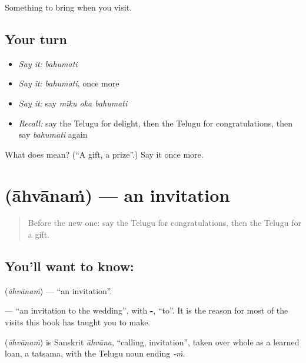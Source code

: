 \begin{grammarlens}[title={What you've built}]
Something to bring when you visit.
\end{grammarlens}

\subsection*{Your turn}
\begin{itemize}
\raggedright
  \item \emph{Say it:} \emph{bahumati}
  \item \emph{Say it:} \emph{bahumati}, once more
  \item \emph{Say it:} say \emph{mīku oka bahumati}
  \item \emph{Recall:} say the Telugu for delight, then the Telugu for congratulations, then say \emph{bahumati} again
\end{itemize}

\begin{tcolorbox}[breakable,colback=teal!4,colframe=teal!35!black,title={Before you move on}]
What does  mean? (\textquotedblleft{}A gift, a prize\textquotedblright{}.) Say it once more.
\end{tcolorbox}
\section[\texorpdfstring{\te{ఆహ్వానం} (āhvānaṁ)}{ఆహ్వానం (āhvānaṁ)}]{ (āhvānaṁ) — an invitation}

\label{lesson:TE-C99-invitation}



\begin{quote}
Before the new one: say the Telugu for congratulations, then the Telugu for a gift.
\end{quote}

\subsection*{You'll want to know: }
\textbf{} (\emph{āhvānaṁ}) — \textquotedblleft{}an invitation\textquotedblright{}.

\textbf{ } — \textquotedblleft{}an invitation to the wedding\textquotedblright{}, with \textbf{-}, \textquotedblleft{}to\textquotedblright{}. It is the reason for most of the visits this book has taught you to make.

\begin{cousinweb}
\textbf{} (\emph{āhvānaṁ}) is Sanskrit \emph{āhvāna}, \textquotedblleft{}calling, invitation\textquotedblright{}, taken over whole as a learned loan, a tatsama, with the Telugu noun ending \emph{-ṁ}.
\end{cousinweb}

